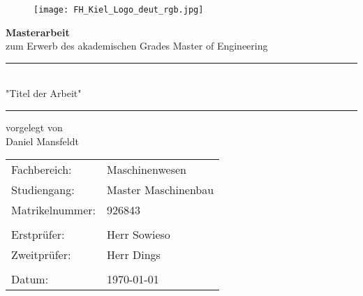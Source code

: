 \begin{titlepage}
	\renewcommand*{\thepage}{Titel}	%
	\centering
	
	\begin{figure}
		\centering
		\texttt{[image: FH\_Kiel\_Logo\_deut\_rgb.jpg]}
	\end{figure}
	
	
	\vspace{2cm}
	{\bfseries \LARGE Masterarbeit}\\
	\bigskip
	zum Erwerb des akademischen	Grades Master of Engineering
	
	\vspace{1cm}
	{\LARGE \bfseries
		\rule{\linewidth}{1pt}\\	%
		"Titel der Arbeit"\\
		\rule{\linewidth}{1pt}
	}
	
	\vspace{1cm}
	vorgelegt von\\
	\bigskip
	Daniel Mansfeldt
	
	
	\vspace{3cm}
	\begin{tabular}{ll}
		Fachbereich: & Maschinenwesen\\
		Studiengang: & Master Maschinenbau\\
		Matrikelnummer: & 926843\\
		&\\
		Erstprüfer: & Herr Sowieso\\
		Zweitprüfer: & Herr Dings\\
		&\\
		Datum: & \today
	\end{tabular}
\end{titlepage}
\cleardoublepage